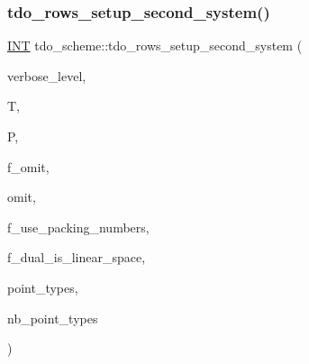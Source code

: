 \subsubsection{\texorpdfstring{tdo\+\_\+rows\+\_\+setup\+\_\+second\+\_\+system()}{tdo\_rows\_setup\_second\_system()}}
{\footnotesize\ttfamily \mbox{\hyperlink{galois_8h_a09fddde158a3a20bd2dcadb609de11dc}{I\+NT}} tdo\+\_\+scheme\+::tdo\+\_\+rows\+\_\+setup\+\_\+second\+\_\+system (\begin{DoxyParamCaption}\item[{\mbox{\hyperlink{galois_8h_a09fddde158a3a20bd2dcadb609de11dc}{I\+NT}}}]{verbose\+\_\+level,  }\item[{\mbox{\hyperlink{classtdo__data}{tdo\+\_\+data}} \&}]{T,  }\item[{\mbox{\hyperlink{classpartitionstack}{partitionstack}} \&}]{P,  }\item[{\mbox{\hyperlink{galois_8h_a09fddde158a3a20bd2dcadb609de11dc}{I\+NT}}}]{f\+\_\+omit,  }\item[{\mbox{\hyperlink{galois_8h_a09fddde158a3a20bd2dcadb609de11dc}{I\+NT}}}]{omit,  }\item[{\mbox{\hyperlink{galois_8h_a09fddde158a3a20bd2dcadb609de11dc}{I\+NT}}}]{f\+\_\+use\+\_\+packing\+\_\+numbers,  }\item[{\mbox{\hyperlink{galois_8h_a09fddde158a3a20bd2dcadb609de11dc}{I\+NT}}}]{f\+\_\+dual\+\_\+is\+\_\+linear\+\_\+space,  }\item[{\mbox{\hyperlink{galois_8h_a09fddde158a3a20bd2dcadb609de11dc}{I\+NT}} $\ast$\&}]{point\+\_\+types,  }\item[{\mbox{\hyperlink{galois_8h_a09fddde158a3a20bd2dcadb609de11dc}{I\+NT}} \&}]{nb\+\_\+point\+\_\+types }\end{DoxyParamCaption})}

\mbox{\label{classtdo__scheme_ac7886fa5ddefefa897905669fb08434f}} 
